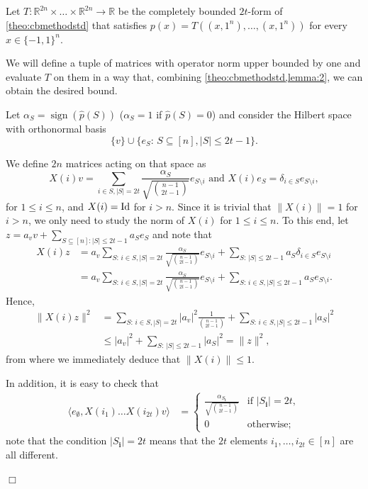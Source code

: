 \documentclass[11pt]{article}
\newcommand{\R}{\mathbb{R}} %
\newcommand{\1}{\mathbf{1}}
\newcommand{\Id}{\ensuremath{\mathop{\rm Id}\nolimits}}
\DeclareMathOperator{\sign}{sign}
\newcommand{\ind}[1]{\mathbf{#1}}
\theoremstyle{plain}
\theoremstyle{definition}
\theoremstyle{remark}
\renewenvironment{proof}[1][]{
    	\begin{trivlist}
     	\item[\hspace{\labelsep}{\em\noindent Proof#1:\/}]}
     	{{\hfill$\Box$}
    	\end{trivlist}
  }
\begin{document}
\begin{proof}
    Let $T:\mathbb R^{2n}\times \dots\times \mathbb R^{2n}\to \R$ be the completely bounded $2t$-form of \cref{theo:cbmethodstd} that satisfies $p(x)=T((x,1^n),\dots,(x,1^n))$ for every $x\in\{-1,1\}^n$. 

    We will define a tuple of matrices with operator norm upper bounded by one and evaluate $T$ on them in a way that, combining \cref{theo:cbmethodstd,lemma:2}, we can obtain the desired bound. 
     
     Let $\alpha_S=\sign(\widehat p (S))$ ($\alpha_S=1$ if  $\widehat p (S)=0$) and consider the Hilbert space with orthonormal basis $$\{v\}\cup \{e_S:\, S\subseteq [n], |S|\leq 2t-1\}.$$ 
     
     We define $2n$ matrices acting on that space as
    $$X(i)v=\sum_{i \in S, |S|={2t}} \frac{\alpha_S}{\sqrt{{n-1\choose 2t-1}}} e_{S\setminus i} \mbox{  and  }  X(i)e_S=\delta_{i\in S} e_{S\setminus i},$$ for $1\leq i\leq n$, and $X(i)=\Id$ for $i>n.$ Since it is trivial that $\|X(i)\|=1$ for $i>n$, we only need to study the norm of $X(i)$ for $1\leq i\leq n$. To this end, let $z=a_vv+\sum_{S\subseteq [n]: |S|\leq 2t-1}a_Se_S$ and note that 
    \begin{align*}
X(i)z&=a_v\sum_{S:\, i \in S, |S|={2t}} \frac{\alpha_S}{\sqrt{{n-1\choose 2t-1}}} e_{S\setminus i}+\sum_{S:\, |S|\leq {2t-1}}a_S\delta_{i\in S} e_{S\setminus i}\\&=a_v\sum_{S:\, i \in S, |S|={2t}} \frac{\alpha_S}{\sqrt{{n-1\choose 2t-1}}} e_{S\setminus i}+\sum_{S:\, i \in S, |S|\leq {2t-1}}a_S e_{S\setminus i}.
    \end{align*} Hence,
    \begin{align*}
\|X(i)z\|^2&=\sum_{S:\, i \in S, |S|={2t}} |a_v|^2\frac{1}{{n-1\choose 2t-1}} +\sum_{S:\, i \in S, |S|\leq {2t-1}}|a_S|^2\\&\leq |a_v|^2+\sum_{S:\, |S|\leq {2t-1}}|a_S|^2 =\|z\|^2,
    \end{align*}from where we immediately deduce that $\|X(i)\|\leq 1$.


   In addition, it is easy to check that
    \begin{align}
        \langle e_\emptyset, X(i_1)\dots X(i_{2t}) v\rangle&=\left\{\begin{array}{ll}
           \frac{\alpha_{S_{\ind i}}}{\sqrt{{n-1\choose 2t-1}}}  &  \text{if } |S_\ind i|=2t,\\
           0  & \text{otherwise};
        \end{array}\right.\label{eq:keypropX}
    \end{align}
    note that the condition $|S_\ind i|=2t$ means that the $2t$ elements $i_1,\ldots, i_{2t}\in [n]$ are all different.
    

\end{proof}
\end{document}
